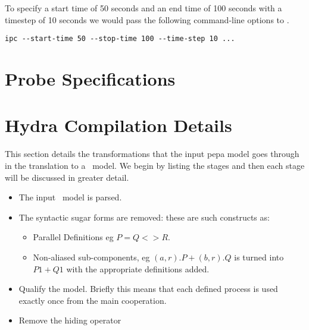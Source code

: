

To specify a start time of 50 seconds and an end time of 100 seconds
with a timestep of 10 seconds we would pass the following command-line
options to \ipc.
\begin{verbatim}
ipc --start-time 50 --stop-time 100 --time-step 10 ...
\end{verbatim}

\section{Probe Specifications}
\label{section:probespecifications}

\ifDeveloperVersion
\section{Hydra Compilation Details}
This section details the transformations that the input pepa model goes
through in the translation to a \hydra\ model.
We begin by listing the stages and then each stage will be discussed in
greater detail.

\begin{itemize}
\item The input \pepa\ model is parsed.
\item The syntactic sugar forms are removed: these are such constructs as:
   \begin{itemize}
      \item Parallel Definitions eg $P = Q <> R$.
      \item Non-aliased sub-components, eg $(a, r).P + (b, r).Q$ is turned
            into $P1 + Q1$ with the appropriate definitions added.
   \end{itemize}
\item Qualify the model. Briefly this means that each defined process is
used exactly once from the main cooperation.
\item Remove the hiding operator
\end{itemize}

